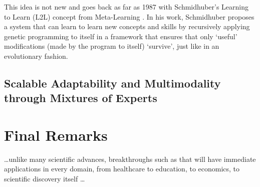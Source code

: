 \documentclass[../main.tex]{subfiles}
\begin{document}
    This idea is not new and goes back as far as 1987 with Schmidhuber's Learning to Learn (L2L) concept from Meta-Learning \cite{schmidhuber_evolutionary_1987}. In his work, Schmidhuber proposes a system that can learn to learn new concepts and skills by recursively applying genetic programming to itself in a framework that ensures that only `useful' modifications (made by the program to itself) `survive', just like in an evolutionary fashion.

    \subsection{Scalable Adaptability and Multimodality through Mixtures of Experts} \label{conclusions:research_directions:moes}

    \section{Final Remarks} \label{conclusions:final_remarks}

    \dots unlike many scientific advances, breakthroughs such as that will have immediate applications in every domain, from healthcare to education, to economics, to scientific discovery itself \dots 

\end{document}
